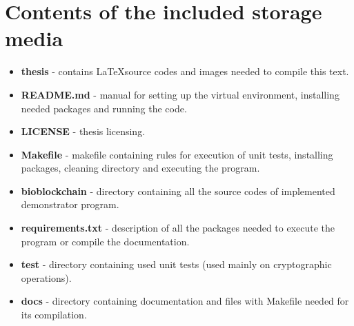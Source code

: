 
\chapter{Contents of the included storage media}

\begin{itemize}
    \item \textbf{thesis} - contains \LaTeX source codes and images needed to compile this text.
    \item \textbf{README.md} - manual for setting up the virtual environment, installing needed packages and running the code.
    \item \textbf{LICENSE} - thesis licensing.
    \item \textbf{Makefile} - makefile containing rules for execution of unit tests, installing packages, cleaning directory and executing the program.
    \item \textbf{bioblockchain} - directory containing all the source codes of implemented demonstrator program.
    \item \textbf{requirements.txt} - description of all the packages needed to execute the program or compile the documentation.
    \item \textbf{test} - directory containing used unit tests (used mainly on cryptographic operations).
    \item \textbf{docs} - directory containing documentation and files with Makefile needed for its compilation.
\end{itemize}


